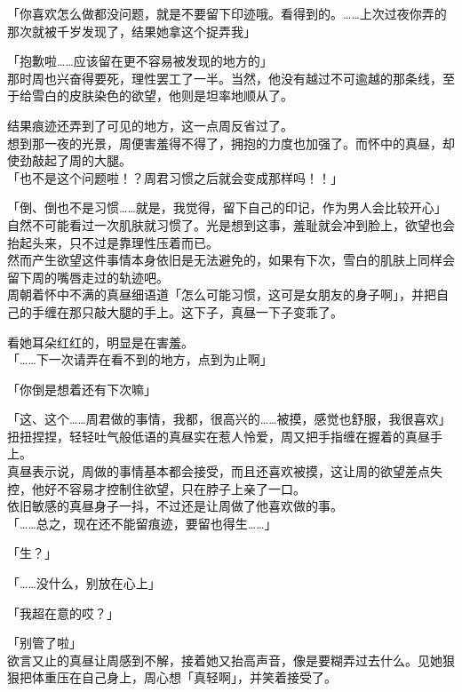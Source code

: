 「你喜欢怎么做都没问题，就是不要留下印迹哦。看得到的。……上次过夜你弄的那次就被千岁发现了，结果她拿这个捉弄我」

「抱歉啦……应该留在更不容易被发现的地方的」\\

那时周也兴奋得要死，理性罢工了一半。当然，他没有越过不可逾越的那条线，至于给雪白的皮肤染色的欲望，他则是坦率地顺从了。

结果痕迹还弄到了可见的地方，这一点周反省过了。\\

想到那一夜的光景，周便害羞得不得了，拥抱的力度也加强了。而怀中的真昼，却使劲敲起了周的大腿。\\

「也不是这个问题啦！？周君习惯之后就会变成那样吗！！」

「倒、倒也不是习惯……就是，我觉得，留下自己的印记，作为男人会比较开心」\\

自然不可能看过一次肌肤就习惯了。光是想到这事，羞耻就会冲到脸上，欲望也会抬起头来，只不过是靠理性压着而已。\\

然而产生欲望这件事情本身依旧是无法避免的，如果有下次，雪白的肌肤上同样会留下周的嘴唇走过的轨迹吧。\\

周朝着怀中不满的真昼细语道「怎么可能习惯，这可是女朋友的身子啊」，并把自己的手缠在那只敲大腿的手上。这下子，真昼一下子变乖了。

看她耳朵红红的，明显是在害羞。\\

「……下一次请弄在看不到的地方，点到为止啊」

「你倒是想着还有下次嘛」

「这、这个……周君做的事情，我都，很高兴的……被摸，感觉也舒服，我很喜欢」\\

扭扭捏捏，轻轻吐气般低语的真昼实在惹人怜爱，周又把手指缠在握着的真昼手上。\\

真昼表示说，周做的事情基本都会接受，而且还喜欢被摸，这让周的欲望差点失控，他好不容易才控制住欲望，只在脖子上亲了一口。\\

依旧敏感的真昼身子一抖，不过还是让周做了他喜欢做的事。\\

「……总之，现在还不能留痕迹，要留也得生……」

「生？」

「……没什么，别放在心上」

「我超在意的哎？」

「别管了啦」\\

欲言又止的真昼让周感到不解，接着她又抬高声音，像是要糊弄过去什么。见她狠狠把体重压在自己身上，周心想「真轻啊」，并笑着接受了。

